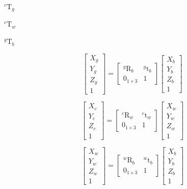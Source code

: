 \documentclass{article}
\begin{document}
$_{}^{c}\textrm{T}_g$
\pagebreak

$_{}^{c}\textrm{T}_w$
\pagebreak

$_{}^{g}\textrm{T}_b$
\pagebreak

\[    \begin{bmatrix}
    X_g\\
    Y_g\\
    Z_g\\
    1
    \end{bmatrix}
    =
    \begin{bmatrix}
    _{}^{g}\textrm{R}_b & _{}^{g}\textrm{t}_b \\
    0_{1 \times 3} & 1
    \end{bmatrix}
    \begin{bmatrix}
    X_b\\
    Y_b\\
    Z_b\\
    1
    \end{bmatrix}
\]
\pagebreak

\[    \begin{bmatrix}
    X_c\\
    Y_c\\
    Z_c\\
    1
    \end{bmatrix}
    =
    \begin{bmatrix}
    _{}^{c}\textrm{R}_w & _{}^{c}\textrm{t}_w \\
    0_{1 \times 3} & 1
    \end{bmatrix}
    \begin{bmatrix}
    X_w\\
    Y_w\\
    Z_w\\
    1
    \end{bmatrix}
\]
\pagebreak

\[    \begin{bmatrix}
    X_w\\
    Y_w\\
    Z_w\\
    1
    \end{bmatrix}
    =
    \begin{bmatrix}
    _{}^{w}\textrm{R}_b & _{}^{w}\textrm{t}_b \\
    0_{1 \times 3} & 1
    \end{bmatrix}
    \begin{bmatrix}
    X_b\\
    Y_b\\
    Z_b\\
    1
    \end{bmatrix}
\]
\pagebreak
\end{document}
